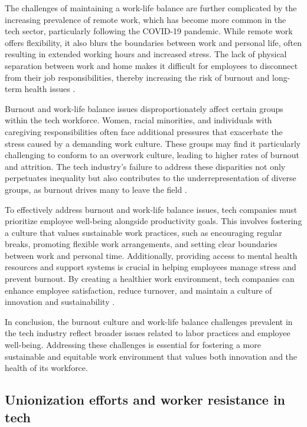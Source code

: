 \begin{refsection}
The challenges of maintaining a work-life balance are further complicated by the increasing prevalence of remote work, which has become more common in the tech sector, particularly following the COVID-19 pandemic. While remote work offers flexibility, it also blurs the boundaries between work and personal life, often resulting in extended working hours and increased stress. The lack of physical separation between work and home makes it difficult for employees to disconnect from their job responsibilities, thereby increasing the risk of burnout and long-term health issues \cite[pp.~125-127]{bailyn2016breaking}.

Burnout and work-life balance issues disproportionately affect certain groups within the tech workforce. Women, racial minorities, and individuals with caregiving responsibilities often face additional pressures that exacerbate the stress caused by a demanding work culture. These groups may find it particularly challenging to conform to an overwork culture, leading to higher rates of burnout and attrition. The tech industry's failure to address these disparities not only perpetuates inequality but also contributes to the underrepresentation of diverse groups, as burnout drives many to leave the field \cite[pp.~167-169]{kapor2017leavers}.

To effectively address burnout and work-life balance issues, tech companies must prioritize employee well-being alongside productivity goals. This involves fostering a culture that values sustainable work practices, such as encouraging regular breaks, promoting flexible work arrangements, and setting clear boundaries between work and personal time. Additionally, providing access to mental health resources and support systems is crucial in helping employees manage stress and prevent burnout. By creating a healthier work environment, tech companies can enhance employee satisfaction, reduce turnover, and maintain a culture of innovation and sustainability \cite[pp.~61-63]{gelles2016mindful}.

In conclusion, the burnout culture and work-life balance challenges prevalent in the tech industry reflect broader issues related to labor practices and employee well-being. Addressing these challenges is essential for fostering a more sustainable and equitable work environment that values both innovation and the health of its workforce.

\subsection{Unionization efforts and worker resistance in tech}


\end{refsection}
